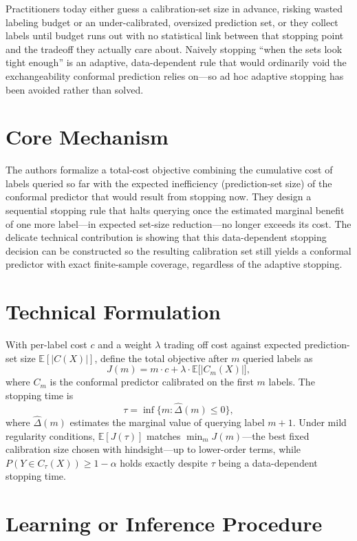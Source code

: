 \documentclass[10pt,twocolumn]{article}
\begin{document}
Practitioners today either guess a calibration-set size in advance,
risking wasted labeling budget or an under-calibrated, oversized
prediction set, or they collect labels until budget runs out with no
statistical link between that stopping point and the tradeoff they
actually care about. Naively stopping ``when the sets look tight
enough'' is an adaptive, data-dependent rule that would ordinarily void
the exchangeability conformal prediction relies on---so ad hoc adaptive
stopping has been avoided rather than solved.

\section{Core Mechanism}

The authors formalize a total-cost objective combining the cumulative
cost of labels queried so far with the expected inefficiency
(prediction-set size) of the conformal predictor that would result from
stopping now. They design a sequential stopping rule that halts
querying once the estimated marginal benefit of one more label---in
expected set-size reduction---no longer exceeds its cost. The delicate
technical contribution is showing that this data-dependent stopping
decision can be constructed so the resulting calibration set still
yields a conformal predictor with exact finite-sample coverage,
regardless of the adaptive stopping.

\section{Technical Formulation}

With per-label cost $c$ and a weight $\lambda$ trading off cost against
expected prediction-set size $\mathbb{E}[|C(X)|]$, define the total
objective after $m$ queried labels as
\[
J(m) = m \cdot c + \lambda \cdot \mathbb{E}\big[|C_m(X)|\big],
\]
where $C_m$ is the conformal predictor calibrated on the first $m$
labels. The stopping time is
\[
\tau = \inf\{m : \widehat\Delta(m) \le 0\},
\]
where $\widehat\Delta(m)$ estimates the marginal value of querying
label $m+1$. Under mild regularity conditions, $\mathbb{E}[J(\tau)]$
matches $\min_m J(m)$---the best fixed calibration size chosen with
hindsight---up to lower-order terms, while
$P(Y \in C_\tau(X)) \ge 1-\alpha$ holds exactly despite $\tau$ being a
data-dependent stopping time.

\section{Learning or Inference Procedure}
\end{document}
